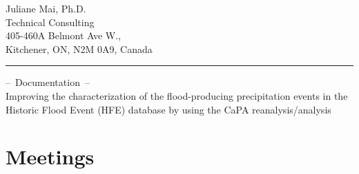 \documentclass[10pt,a4paper,titlepage,parskip]{scrartcl}
\begin{document}
  
	
	\vspace*{-1cm}
	\pagestyle{fancy}
	
	\begin{center}
		Juliane Mai, Ph.D.\\
		Technical Consulting\\[4pt]
		405-460A Belmont Ave W., \\
		Kitchener, ON, N2M 0A9, Canada\\[10pt]
		{\rule{\linewidth}{0.4pt}}
	\end{center}
	\begin{center}
		\textcolor{myBlue}{{\Large --~Documentation~--}}\\[4pt]
		Improving the characterization of the flood-producing precipitation events in the Historic Flood Event (HFE) database by using the CaPA reanalysis/analysis\\[4pt]
	\end{center}
	
\tableofcontents
\pagebreak

\section{Meetings}
\end{document}
